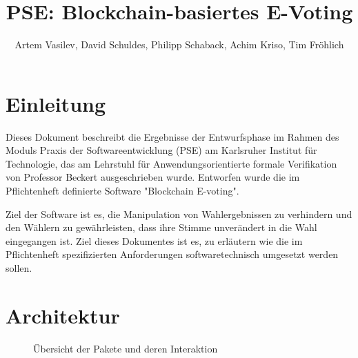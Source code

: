 \documentclass[parskip=full]{scrartcl}
\title{PSE: Blockchain-basiertes E-Voting}
\author{Artem Vasilev, David Schuldes, Philipp Schaback, Achim Kriso, Tim Fröhlich}
\begin{document}
	\clearpage
	\maketitle
	\newpage
	
	\tableofcontents
	\newpage
	\section{Einleitung}
	Dieses Dokument beschreibt die Ergebnisse der Entwurfsphase im Rahmen des Moduls Praxis der Softwareentwicklung (PSE) am Karlsruher Institut für Technologie, das am Lehrstuhl für Anwendungsorientierte formale Verifikation von Professor Beckert ausgeschrieben wurde.
	Entworfen wurde die im Pflichtenheft definierte Software "Blockchain E-voting". 
	
	Ziel der Software ist es, die Manipulation
	von Wahlergebnissen zu verhindern und den Wählern zu gewährleisten, dass ihre Stimme unverändert in die Wahl eingegangen ist.
	Ziel dieses Dokumentes ist es, zu erläutern wie die im Pflichtenheft spezifizierten Anforderungen softwaretechnisch umgesetzt werden sollen.
	
	\section{Architektur}
	\begin{figure}[!h]
	\centering
	
	\caption{Übersicht der Pakete und deren Interaktion}
	\end{figure}
\end{document}
